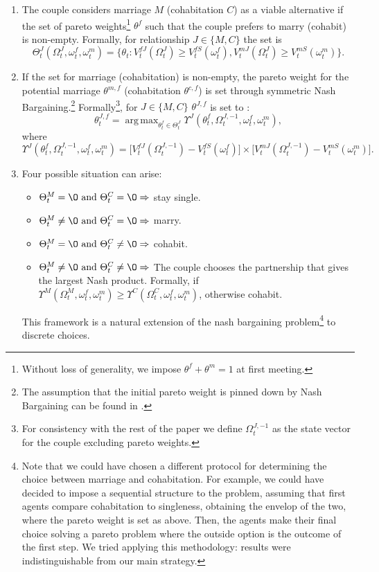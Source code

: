 \documentclass[12pt]{article}
\numberwithin{table}{section}
\DeclareMathOperator*{\argmax}{arg\,max}
\begin{document}
\begin{enumerate}
\item The couple considers marriage $M$ (cohabitation $C$) as a viable alternative if the set of pareto weights\footnote{Without loss of generality, we impose $\theta^f+\theta^m=1$ at first meeting.} $\theta^f$ such that the couple prefers to marry (cohabit) is non-empty. Formally, for relationship $J\in\{M,C\}$ the set is
\begin{equation}\label{eq:set_couple}
\Theta^J_t(\Omega^J_t,\omega^f_t,\omega^m_t)=\big\{\theta_t: V_t^{fJ}(\Omega^J_t)\geq V_t^{fS}(\omega^f_t), V_t^{mJ}(\Omega^J_t)\geq V_t^{mS}(\omega^m_t)\big\}.
\end{equation}
\item If the set for marriage (cohabitation) is non-empty, the pareto weight for the potential marriage $\theta^{m,f}$ (cohabitation $\theta^{c,f}$) is set through symmetric Nash Bargaining.\footnote{The assumption that the initial pareto weight is pinned down by Nash Bargaining can be found in \cite{low2018}.} Formally\footnote{For consistency with the rest of the paper we define $\Omega^{J,-1}_t$ as the state vector for the couple excluding pareto weights.}, for $J\in\{M,C\}$ $\theta^{J,f}$ is set to :
\begin{equation}\label{nash_couple}
\theta^{J,f}_t= \argmax_{\theta^f_t\in\Theta^J_t} \Upsilon^J(\theta^f_t,\Omega^{J,-1}_t,\omega^f_t,\omega^m_t),
\end{equation}
where
\begin{equation}
\Upsilon^J(\theta^f_t,\Omega^{J,-1}_t,\omega^f_t,\omega^m_t)=\big[V_t^{fJ}(\Omega^{J,-1}_t)- V_t^{fS}(\omega^f_t)\big]\times\big[ V_t^{mJ}(\Omega^{J,-1}_t)- V_t^{mS}(\omega^m_t)\big].
\end{equation}
\item Four possible situation can arise:
\begin{itemize}
\item $\Theta^M_t=\O\text{ and }\Theta^C_t=\O \Rightarrow$ stay single.
\item $\Theta^M_t\neq\O\text{ and }\Theta^C_t=\O \Rightarrow$ marry.
\item $\Theta^M_t=\O\text{ and }\Theta^C_t\neq\O \Rightarrow$ cohabit.
\item $\Theta^M_t\neq\O\text{ and }\Theta^C_t\neq\O \Rightarrow$ The couple chooses the partnership that gives the largest Nash product. Formally, if $ \Upsilon^M(\Omega^M_t,\omega^f_t,\omega^m_t)\geq\Upsilon^C(\Omega^C_t,\omega^f_t,\omega^m_t)$, otherwise cohabit.
\end{itemize}
This framework is a natural extension of the nash bargaining problem\footnote{Note that we could have chosen a different protocol for determining the choice between marriage and cohabitation. For example, we could have decided to impose a sequential structure to the problem, assuming that first agents compare cohabitation to singleness, obtaining the envelop of the two, where the pareto weight is set as above. Then, the agents make their final choice solving a pareto problem where the outside option is the outcome of the first step. We tried applying this methodology: results were indistinguishable from our main strategy.} to discrete choices.
\end{enumerate}
\end{document}
